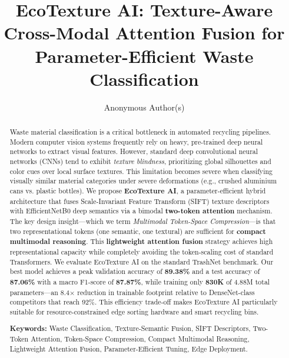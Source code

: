 \documentclass[12pt, a4paper]{article}
\title{EcoTexture AI: Texture-Aware Cross-Modal Attention Fusion for Parameter-Efficient Waste Classification}
\author{Anonymous Author(s)}
\affil{Anonymous Institution}
\date{}
\begin{document}
\maketitle

\vspace{1.5em}

\begin{abstract}
Waste material classification is a critical bottleneck in automated recycling pipelines. Modern computer vision systems frequently rely on heavy, pre-trained deep neural networks to extract visual features. However, standard deep convolutional neural networks (CNNs) tend to exhibit \emph{texture blindness}, prioritizing global silhouettes and color cues over local surface textures. This limitation becomes severe when classifying visually similar material categories under severe deformations (e.g., crushed aluminium cans vs. plastic bottles). We propose \textbf{EcoTexture AI}, a parameter-efficient hybrid architecture that fuses Scale-Invariant Feature Transform (SIFT) texture descriptors with EfficientNetB0 deep semantics via a bimodal \textbf{two-token attention} mechanism. The key design insight---which we term \emph{Multimodal Token-Space Compression}---is that two representational tokens (one semantic, one textural) are sufficient for \textbf{compact multimodal reasoning}. This \textbf{lightweight attention fusion} strategy achieves high representational capacity while completely avoiding the token-scaling cost of standard Transformers. We evaluate EcoTexture AI on the standard TrashNet benchmark. Our best model achieves a peak validation accuracy of \textbf{89.38\%} and a test accuracy of \textbf{87.06\%} with a macro F1-score of \textbf{87.87\%}, while training only \textbf{830K} of 4.88M total parameters---an 8.4$\times$ reduction in trainable footprint relative to DenseNet-class competitors that reach 92\%. This efficiency trade-off makes EcoTexture AI particularly suitable for resource-constrained edge sorting hardware and smart recycling bins.
\bigskip

\noindent \textbf{Keywords:} Waste Classification, Texture-Semantic Fusion, SIFT Descriptors, Two-Token Attention, Token-Space Compression, Compact Multimodal Reasoning, Lightweight Attention Fusion, Parameter-Efficient Tuning, Edge Deployment.

\bigskip
\end{abstract}

\newpage
\tableofcontents
\newpage
\end{document}
